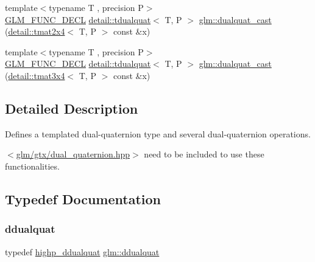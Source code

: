 \begin{DoxyCompactItemize}
\item 
{\footnotesize template$<$typename T , precision P$>$ }\\\hyperlink{setup_8hpp_ab2d052de21a70539923e9bcbf6e83a51}{G\+L\+M\+\_\+\+F\+U\+N\+C\+\_\+\+D\+E\+CL} \hyperlink{structglm_1_1detail_1_1tdualquat}{detail\+::tdualquat}$<$ T, P $>$ \hyperlink{group__gtc__dual__quaternion_gad47c752ec23a5f9924e7d7f84c40f3e5}{glm\+::dualquat\+\_\+cast} (\hyperlink{structglm_1_1detail_1_1tmat2x4}{detail\+::tmat2x4}$<$ T, P $>$ const \&x)
\item 
{\footnotesize template$<$typename T , precision P$>$ }\\\hyperlink{setup_8hpp_ab2d052de21a70539923e9bcbf6e83a51}{G\+L\+M\+\_\+\+F\+U\+N\+C\+\_\+\+D\+E\+CL} \hyperlink{structglm_1_1detail_1_1tdualquat}{detail\+::tdualquat}$<$ T, P $>$ \hyperlink{group__gtc__dual__quaternion_ga97c4fb8941ad1954e01578cca8182180}{glm\+::dualquat\+\_\+cast} (\hyperlink{structglm_1_1detail_1_1tmat3x4}{detail\+::tmat3x4}$<$ T, P $>$ const \&x)
\end{DoxyCompactItemize}


\subsection{Detailed Description}
Defines a templated dual-\/quaternion type and several dual-\/quaternion operations. 

$<$\hyperlink{dual__quaternion_8hpp}{glm/gtx/dual\+\_\+quaternion.\+hpp}$>$ need to be included to use these functionalities. 

\subsection{Typedef Documentation}
\mbox{\label{group__gtc__dual__quaternion_ga373431ffdd82d5c03c258217a9e1f1a6}} 
\subsubsection{\texorpdfstring{ddualquat}{ddualquat}}
{\footnotesize\ttfamily typedef \hyperlink{group__gtc__dual__quaternion_ga61b654c21f080135aedcf23461eb1037}{highp\+\_\+ddualquat} \hyperlink{group__gtc__dual__quaternion_ga373431ffdd82d5c03c258217a9e1f1a6}{glm\+::ddualquat}}

